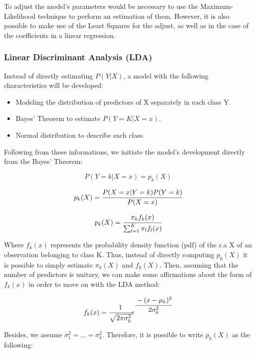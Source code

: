 To adjust the model's parameters would be necessary to use
the Maximum-Likelihood technique to perform an estimation of them. However, it is also possible
to make use of the Least Squares for the adjust, as well as in the case of the 
coefficients in a linear regression.

\subsubsection{Linear Discriminant Analysis (LDA)}
Instead of directly estimating $P(Y|X)$, a model with the following characteristics will 
be developed:

\begin{itemize}
    \item Modeling the distribution of predictors of X separately in each class Y.
    \item Bayes' Theorem to estimate $P(Y = K|X = x)$.
    \item Normal distribution to describe each class.
\end{itemize}

Following from these informations, we initiate the model's development directly from the 
Bayes' Theorem:

\begin{equation}
    P(Y=k|X=x) = p_k(X) \label{eq4}
\end{equation}

\begin{equation}
    p_k(X) = \cfrac{P(X=x|Y=k)P(Y = k)}{P(X=x)} \label{eq5}
\end{equation}

\begin{equation}
    p_k(X) = \cfrac{\pi_k f_k(x)}{\sum^{K}_{l=1}\pi_lf_l(x)} \label{eq6}
\end{equation}

Where $f_k(x)$ represents the probability density function (pdf) of the r.a X of 
an observation belonging to class K. Thus, instead of directly computing $p_k(X)$ it is 
possible to simply estimate $\pi_k(X)$ and $f_k(X)$. Then, assuming that the number of 
predictors is unitary, we can make some affirmations about the form of $f_k(x)$ in order
to move on with the LDA method:

\begin{equation}
    f_k(x) = \cfrac{1}{\sqrt{2\pi\sigma^2_k}}e^{\cfrac{-(x-\mu_k)^2}{2\sigma^2_k}} \label{eq7}
\end{equation}

Besides, we assume $\sigma_1^2=...=\sigma_k^2$. Therefore, it is possible to write $p_k(X)$ 
as the following:

